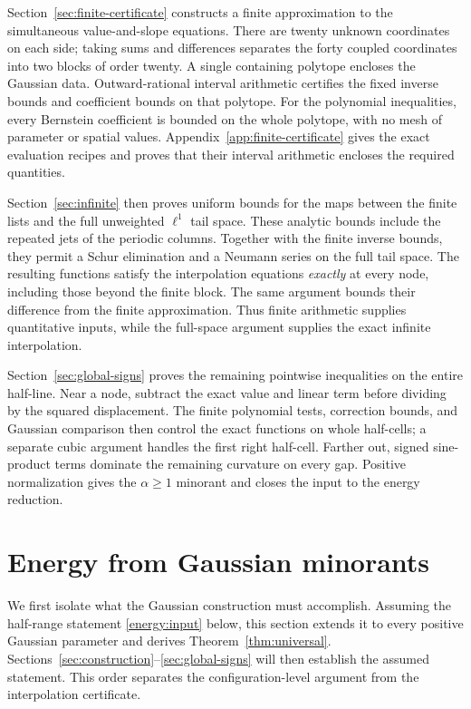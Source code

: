 \documentclass[11pt]{article}
\theoremstyle{remark}\newtheorem{remark}[theorem]{Remark}
\begin{document}
Section~\ref{sec:finite-certificate} constructs a finite approximation to
the simultaneous value-and-slope equations. There are twenty unknown
coordinates on each side; taking sums and differences separates the forty
coupled coordinates into two blocks of order twenty. A single containing
polytope encloses the Gaussian data. Outward-rational interval arithmetic
certifies the fixed inverse bounds and coefficient bounds on that polytope.
For the polynomial inequalities, every Bernstein coefficient is bounded
on the whole polytope, with no mesh of parameter or spatial values.
Appendix~\ref{app:finite-certificate} gives the exact evaluation recipes
and proves that their interval arithmetic encloses the required quantities.

Section~\ref{sec:infinite} then proves uniform bounds for the maps between
the finite lists and the full unweighted $\ell^1$ tail space. These analytic
bounds include the repeated jets of the periodic columns. Together with the
finite inverse bounds, they permit a Schur elimination and a Neumann series
on the full tail space. The resulting functions satisfy the interpolation
equations \emph{exactly} at every node, including those beyond the finite
block. The same argument bounds their difference from the finite
approximation. Thus finite arithmetic supplies quantitative inputs, while
the full-space argument supplies the exact infinite interpolation.

Section~\ref{sec:global-signs} proves the remaining pointwise inequalities
on the entire half-line. Near a node, subtract the exact value and linear
term before dividing by the squared displacement. The finite polynomial
tests, correction bounds, and Gaussian comparison then control the exact
functions on whole half-cells; a separate cubic argument handles the first
right half-cell. Farther out, signed sine-product terms dominate the
remaining curvature on every gap. Positive normalization gives the
$\alpha\ge1$ minorant and closes the input to the energy reduction.

\section{Energy from Gaussian minorants}
\label{energy:section}

We first isolate what the Gaussian construction must accomplish.
Assuming the half-range statement \eqref{energy:input} below, this section
extends it to every positive Gaussian parameter and derives
Theorem~\ref{thm:universal}. Sections~\ref{sec:construction}--\ref{sec:global-signs}
will then establish the assumed statement. This order separates the
configuration-level argument from the interpolation certificate.
\end{document}
